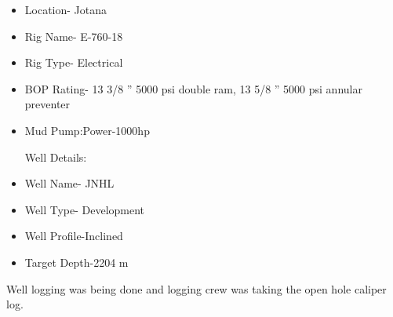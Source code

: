 \begin{enumerate}
\vspace{1em}

\begin{itemize}

\item Location- Jotana
\item Rig Name- E-760-18

\item Rig Type- Electrical

\item BOP Rating- 13 3/8 ” 5000 psi double ram, 13 5/8 ” 5000 psi annular preventer

\item Mud Pump:Power-1000hp

\noindent Well Details:

\item Well Name- JNHL

\item Well Type- Development

\item Well Profile-Inclined

\item Target Depth-2204 m

\end{itemize}

\vspace{1em}

\noindent Well logging was being done and logging crew was taking the open
hole caliper log.


\end{enumerate}
